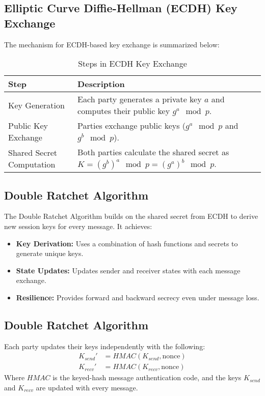 \documentclass[11pt]{article}
\begin{document}
\subsection{Elliptic Curve Diffie-Hellman (ECDH) Key Exchange}
The mechanism for ECDH-based key exchange is summarized below:

\begin{table}[h!]
\centering
\begin{tabular}{|p{4cm}|p{8cm}|}
\hline
\textbf{Step}              & \textbf{Description}                                                                                  \\ \hline
Key Generation             & Each party generates a private key \(a\) and computes their public key \(g^a \mod p\).                \\ \hline
Public Key Exchange        & Parties exchange public keys (\(g^a \mod p\) and \(g^b \mod p\)).                                     \\ \hline
Shared Secret Computation  & Both parties calculate the shared secret as \(K = (g^b)^a \mod p = (g^a)^b \mod p\).                  \\ \hline
\end{tabular}
\caption{Steps in ECDH Key Exchange}
\end{table}

\subsection{Double Ratchet Algorithm}
The Double Ratchet Algorithm builds on the shared secret from ECDH to derive new session keys for every message. It achieves:

\begin{itemize}
    \item \textbf{Key Derivation:} Uses a combination of hash functions and secrets to generate unique keys.
    \item \textbf{State Updates:} Updates sender and receiver states with each message exchange.
    \item \textbf{Resilience:} Provides forward and backward secrecy even under message loss.
\end{itemize}


\subsection{Double Ratchet Algorithm}
Each party updates their keys independently with the following:
\begin{align*}
K_{send}' &= HMAC(K_{send}, \text{nonce}) \\
K_{recv}' &= HMAC(K_{recv}, \text{nonce})
\end{align*}
Where $HMAC$ is the keyed-hash message authentication code, and the keys $K_{send}$ and $K_{recv}$ are updated with every message.
\end{document}
